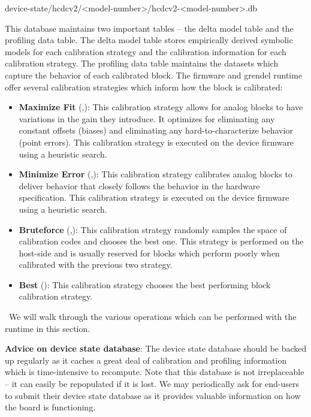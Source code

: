 \begin{snippet}
  device-state/hcdcv2/<model-number>/hcdcv2-<model-number>.db
\end{snippet}

This database maintains two important tables -- the delta model table and the
profiling data table. The delta model table stores empirically derived symbolic
models for each calibration strategy and the calibration information for each
calibration strategy. The profiling data table maintains the datasets which
capture the behavior of each calibrated block. The firmware and grendel runtime
offer several calibration strategies which inform how the block is calibrated:

\begin{itemize}
\item \textbf{Maximize Fit} (,): This calibration strategy allows for analog blocks
  to have variations in the gain they introduce. It optimizes for eliminating
  any constant offsets (biases) and eliminating any hard-to-characterize behavior (point
  errors). This calibration strategy is executed on the device firmware using a
  heuristic search.
  \item\textbf{Minimize Error} (,): This calibration strategy calibrates analog
    blocks to deliver behavior that closely follows the behavior in the hardware
    specification. This calibration strategy is executed on the device firmware
    using a heuristic search.
    \item\textbf{Bruteforce} (,): This calibration strategy randomly samples the
      space of calibration codes and chooses the best one. This strategy is
      performed on the host-side and is usually reserved for blocks which
      perform poorly when calibrated with the previous two strategy.
    \item\textbf{Best} (): This calibration strategy chooses the best performing block
      calibration strategy.
    
\end{itemize}

\noindent~We will walk through the various operations which can be performed
with the \grendel runtime in this section.

\noindent\textbf{Advice on device state database}: The device state database
should be backed up regularly as it caches a great deal of calibration and
profiling information which is time-intensive to recompute. Note that this
database is not irreplaceable -- it can easily be repopulated if it is lost. We
may periodically ask for end-users to submit their device state database as it
provides valuable information on how the board is functioning.


